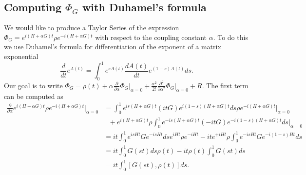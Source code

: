 \documentclass{article}
\begin{document}
\subsection{Computing $\Phi_G$ with Duhamel's formula}
We would like to produce a Taylor Series of the expression $\Phi_G = e^{i(H+\alpha G) t} \rho e^{-i(H+\alpha G) t}$ with respect to the coupling constant $\alpha$. To do this we use Duhamel's formula for differentiation of the exponent of a matrix exponential
\begin{equation}
    \frac{d}{dt} e^{A(t)} = \int_0^1 e^{s A(t)} \frac{d A(t)}{dt} e^{(1-s)A(t)} ds.
\end{equation}
Our goal is to write $\Phi_G = \rho(t) + \alpha \frac{\partial}{\partial \alpha} \Phi_G \big|_{\alpha=0} + \frac{\alpha^2}{2!} \frac{\partial^2}{\partial \alpha^2} \Phi_G \big|_{\alpha=0} + R$. The first term can be computed as
\begin{align}
    \frac{\partial}{\partial \alpha} e^{i(H+\alpha G)t} \rho e^{-i (H+\alpha G)t} \bigg|_{\alpha = 0} &= \int_{0}^{1} e^{i s (H+\alpha G)t} (i t G) e^{i (1-s) (H+\alpha G)t} ds \rho e^{-i(H+\alpha G)t} \bigg|_{\alpha=0} \nonumber \\
    &\text{ } + e^{i(H+\alpha G)t} \rho \int_{0}^1 e^{-i s (H+\alpha G) t} (- i t G) e^{-i (1-s) (H+\alpha G)t} ds \bigg|_{\alpha = 0} \label{eq:first_order_alpha_derivative}\\
    &= i t \int_0^1 e^{i s H t} G e^{-i s H t} ds e^{i H t} \rho e^{-i H t} - i t e^{+i H t} \rho \int_0^1 e^{-is H t} G e^{-i(1-s) Ht} ds \\
    &= i t \int_0^1 G(s t) ds \rho(t) - it \rho(t) \int_0^1 G(s t) ds \\
    &= i t \int_0^1 [G(s t), \rho(t)] ds.
\end{align}
\end{document}
